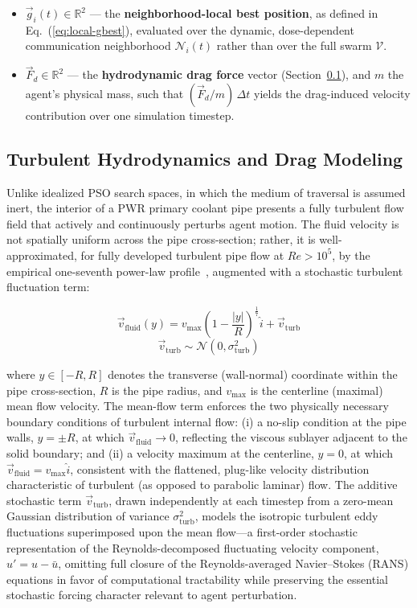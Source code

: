 \documentclass[journal]{IEEEtran}
\begin{document}
\begin{itemize}
    \item $\vec{g}_i(t) \in \mathbb{R}^2$ --- the \textbf{neighborhood-local best position}, as defined in Eq.~(\ref{eq:local-gbest}), evaluated over the dynamic, dose-dependent communication neighborhood $\mathcal{N}_i(t)$ rather than over the full swarm $\mathcal{V}$.
    \item $\vec{F}_d \in \mathbb{R}^2$ --- the \textbf{hydrodynamic drag force} vector (Section~\ref{sec:hydro}), and $m$ the agent's physical mass, such that $(\vec{F}_d / m)\,\Delta t$ yields the drag-induced velocity contribution over one simulation timestep.
\end{itemize}

\subsection{Turbulent Hydrodynamics and Drag Modeling}
\label{sec:hydro}

Unlike idealized PSO search spaces, in which the medium of traversal is assumed inert, the interior of a PWR primary coolant pipe presents a fully turbulent flow field that actively and continuously perturbs agent motion. The fluid velocity is not spatially uniform across the pipe cross-section; rather, it is well-approximated, for fully developed turbulent pipe flow at $Re > 10^5$, by the empirical one-seventh power-law profile~\cite{turbulent_flow}, augmented with a stochastic turbulent fluctuation term:

\begin{equation}
\vec{v}_{\text{fluid}}(y) = v_{\max}\left(1 - \frac{|y|}{R}\right)^{\frac{1}{7}}\hat{i} + \vec{v}_{\text{turb}}
\end{equation}
\begin{equation}
\vec{v}_{\text{turb}} \sim \mathcal{N}\left(0, \sigma_{\text{turb}}^2\right)
\end{equation}

where $y \in [-R, R]$ denotes the transverse (wall-normal) coordinate within the pipe cross-section, $R$ is the pipe radius, and $v_{\max}$ is the centerline (maximal) mean flow velocity. The mean-flow term enforces the two physically necessary boundary conditions of turbulent internal flow: (i) a no-slip condition at the pipe walls, $y = \pm R$, at which $\vec{v}_{\text{fluid}} \to 0$, reflecting the viscous sublayer adjacent to the solid boundary; and (ii) a velocity maximum at the centerline, $y = 0$, at which $\vec{v}_{\text{fluid}} = v_{\max}\hat{i}$, consistent with the flattened, plug-like velocity distribution characteristic of turbulent (as opposed to parabolic laminar) flow. The additive stochastic term $\vec{v}_{\text{turb}}$, drawn independently at each timestep from a zero-mean Gaussian distribution of variance $\sigma_{\text{turb}}^2$, models the isotropic turbulent eddy fluctuations superimposed upon the mean flow---a first-order stochastic representation of the Reynolds-decomposed fluctuating velocity component, $u' = u - \bar{u}$, omitting full closure of the Reynolds-averaged Navier--Stokes (RANS) equations in favor of computational tractability while preserving the essential stochastic forcing character relevant to agent perturbation.
\end{document}
